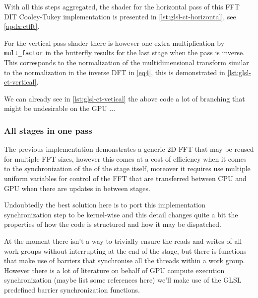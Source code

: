 \documentclass[
  oneside,
  11pt, a4paper,
  footinclude=true,
  headinclude=true,
  cleardoublepage=empty
]{scrbook}
\begin{document}

With all this steps aggregated, the shader for the horizontal pass of this FFT DIT Cooley-Tukey implementation is presented in \autoref{lst:glsl-ct-horizontal}, see \autoref{apdx:ctfft}.


For the vertical pass shader there is however one extra multiplication by \texttt{mult\_factor} in the butterfly results for the last stage when the pass is inverse. This corresponds to the normalization of the multidimensional transform similar to the normalization in the inverse DFT in \autoref{eq4}, this is demonstrated in \autoref{lst:glsl-ct-vertical}.

We can already see in \autoref{lst:glsl-ct-vetical} the above code a lot of branching that might be undesirable on the GPU  ... %

\subsubsection{All stages in one pass} \label{subsec:all-stages-in-one-pass}

The previous implementation demonstrates a generic 2D FFT that may be reused for multiple FFT sizes, however this comes at a cost of efficiency when it comes to the synchronization of the of the stage itself, moreover it requires use multiple uniform variables for control of the FFT that are transferred between CPU and GPU when there are updates in between stages.
\newline

Undoubtedly the best solution here is to port this implementation synchronization step to be kernel-wise and this detail changes quite a bit the properties of how the code is structured and how it may be dispatched.

At the moment there isn't a way to trivially ensure the reads and writes of all work groups  \cite{stuart2011efficient} without interrupting at the end of the stage, but there is functions that make use of barriers that synchronise all the threads within a work group. However there is a lot of literature on behalf of GPU compute execution synchronization (maybe list some references here) we'll make use of the GLSL predefined barrier synchronization functions.
\end{document}
